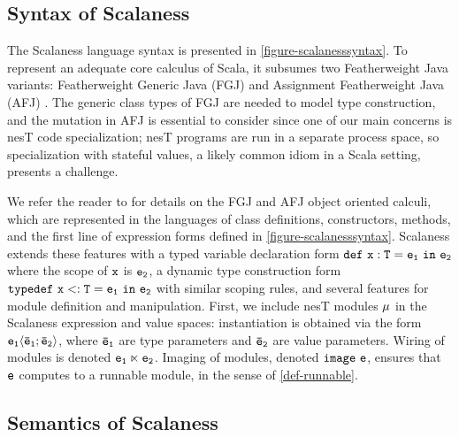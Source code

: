 
\subsection{Syntax of Scalaness}

\scalanesssyntaxfig The Scalaness language syntax is presented in
\autoref{figure-scalanesssyntax}. To represent an adequate core
calculus of Scala, it subsumes two Featherweight Java variants:
Featherweight Generic Java (FGJ) \cite{FJ} and Assignment Featherweight Java
(AFJ) \cite{AFJ}. The generic class types of FGJ are needed to model
type construction, and the mutation in AFJ is essential to consider
since one of our main concerns is nesT code specialization; nesT
programs are run in a separate process space, so specialization with
stateful values, a likely common idiom in a Scala setting, presents a
challenge.

We refer the reader to \cite{FJ,AFJ} for details on the FGJ and AFJ
object oriented calculi, which are represented in the languages of
class definitions, constructors, methods, and the first line of expression
forms defined in \autoref{figure-scalanesssyntax}. Scalaness extends
these features with a typed variable declaration form
$\jdef{x}{T}{e_1}{e_2}$ where the scope of $\ttt{x}$ is $\tt{e_2}$, a
dynamic type construction form $\jtlet{x}{T}{e_1}{e_2}$ with similar
scoping rules, and several features for module definition and
manipulation. First, we include nesT modules $\jmodval$ in the
Scalaness expression and value spaces: instantiation is
obtained via the form $\jinst{e_1}{\ttvec{e}_1; \ttvec{e}_2}$, where
$\ttvec{e}_\tt{1}$ are type parameters and $\ttvec{e}_\tt{2}$ are
value parameters. Wiring of modules is denoted
$\jwire{\tt{e_1}}{\tt{e_2}}$.  Imaging of modules, denoted
$\jimage{\tt{e}}$, ensures that $\tt{e}$ computes to a runnable
module, in the sense of \autoref{def-runnable}.

\subsection{Semantics of Scalaness}

